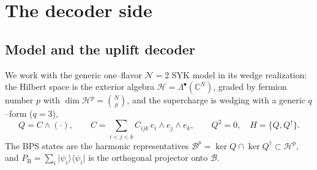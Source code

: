 \documentclass[11pt]{article}
\newcommand{\ket}[1]{\lvert #1\rangle}
\newcommand{\bra}[1]{\langle #1\rvert}
\newcommand{\PB}{P_{\mathrm B}}
\newcommand{\dg}{^{\dagger}}
\begin{document}
\section{The decoder side}
\label{sec:decoder}

\subsection{Model and the uplift decoder}
We work with the generic one--flavor $\mathcal N{=}2$ SYK model in its wedge realization: the
Hilbert space is the exterior algebra $\mathcal H=\Lambda^\bullet(\mathbb C^N)$, graded by fermion
number $p$ with $\dim\mathcal H^p=\binom Np$, and the supercharge is wedging with a generic
$q$--form ($q=3$),
\begin{equation}
  Q = C\wedge(\cdot),\qquad C=\!\!\sum_{i<j<k}\!\! C_{ijk}\,e_i\wedge e_j\wedge e_k,\qquad Q^2=0,\quad
  H=\{Q,Q\dg\}.
\end{equation}
The BPS states are the harmonic representatives $\mathcal B^p=\ker Q\cap\ker Q\dg\subset\mathcal H^p$,
and $\PB=\sum_i\ket{\psi_i}\bra{\psi_i}$ is the orthogonal projector onto $\mathcal B$.
\end{document}
